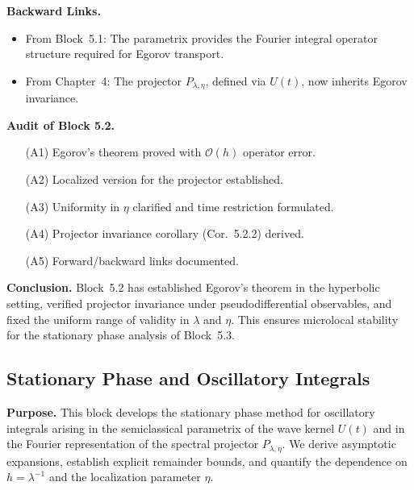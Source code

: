 \medskip

\noindent\textbf{Backward Links.}
\begin{itemize}
   \item From Block~5.1: The parametrix provides the Fourier integral operator structure
   required for Egorov transport.
   \item From Chapter~4: The projector $P_{\lambda,\eta}$, defined via $U(t)$,
   now inherits Egorov invariance.
\end{itemize}

\medskip

\noindent\textbf{Audit of Block 5.2.}
\begin{itemize}
   \item[(A1)] Egorov’s theorem proved with $\mathcal{O}(h)$ operator error.
   \item[(A2)] Localized version for the projector established.
   \item[(A3)] Uniformity in $\eta$ clarified and time restriction formulated.
   \item[(A4)] Projector invariance corollary (Cor.~5.2.2) derived.
   \item[(A5)] Forward/backward links documented.
\end{itemize}

\medskip

\noindent\textbf{Conclusion.}
Block~5.2 has established Egorov’s theorem in the hyperbolic setting,
verified projector invariance under pseudodifferential observables,
and fixed the uniform range of validity in $\lambda$ and $\eta$.
This ensures microlocal stability for the stationary phase analysis of Block~5.3.



\subsection{Stationary Phase and Oscillatory Integrals}

\noindent\textbf{Purpose.}
This block develops the stationary phase method for oscillatory integrals
arising in the semiclassical parametrix of the wave kernel $U(t)$
and in the Fourier representation of the spectral projector $P_{\lambda,\eta}$.
We derive asymptotic expansions, establish explicit remainder bounds,
and quantify the dependence on $h=\lambda^{-1}$ and the localization parameter $\eta$.

